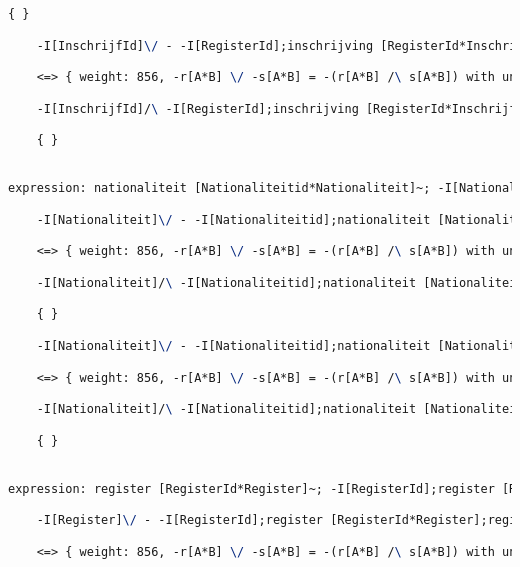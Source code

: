 \begin{lstlisting}[language=TeX]
    { }

    -I[InschrijfId]\/ - -I[RegisterId];inschrijving [RegisterId*InschrijfId];inschrijving [RegisterId*InschrijfId]~

    <=> { weight: 856, -r[A*B] \/ -s[A*B] = -(r[A*B] /\ s[A*B]) with unifier: {A->I[InschrijfId], B->I[InschrijfId], r->I[InschrijfId], s->inschrijving [RegisterId*InschrijfId]~;-I[RegisterId];inschrijving [RegisterId*InschrijfId]} }

    -I[InschrijfId]/\ -I[RegisterId];inschrijving [RegisterId*InschrijfId];inschrijving [RegisterId*InschrijfId]~

    { }


expression: nationaliteit [Nationaliteitid*Nationaliteit]~; -I[Nationaliteitid];nationaliteit [Nationaliteitid*Nationaliteit] |- -I[Nationaliteit]

    -I[Nationaliteit]\/ - -I[Nationaliteitid];nationaliteit [Nationaliteitid*Nationaliteit];nationaliteit [Nationaliteitid*Nationaliteit]~

    <=> { weight: 856, -r[A*B] \/ -s[A*B] = -(r[A*B] /\ s[A*B]) with unifier: {A->I[Nationaliteit], B->I[Nationaliteit], r->nationaliteit [Nationaliteitid*Nationaliteit]~;-I[Nationaliteitid];nationaliteit [Nationaliteitid*Nationaliteit], s->I[Nationaliteit]} }

    -I[Nationaliteit]/\ -I[Nationaliteitid];nationaliteit [Nationaliteitid*Nationaliteit];nationaliteit [Nationaliteitid*Nationaliteit]~

    { }

    -I[Nationaliteit]\/ - -I[Nationaliteitid];nationaliteit [Nationaliteitid*Nationaliteit];nationaliteit [Nationaliteitid*Nationaliteit]~

    <=> { weight: 856, -r[A*B] \/ -s[A*B] = -(r[A*B] /\ s[A*B]) with unifier: {A->I[Nationaliteit], B->I[Nationaliteit], r->I[Nationaliteit], s->nationaliteit [Nationaliteitid*Nationaliteit]~;-I[Nationaliteitid];nationaliteit [Nationaliteitid*Nationaliteit]} }

    -I[Nationaliteit]/\ -I[Nationaliteitid];nationaliteit [Nationaliteitid*Nationaliteit];nationaliteit [Nationaliteitid*Nationaliteit]~

    { }


expression: register [RegisterId*Register]~; -I[RegisterId];register [RegisterId*Register] |- -I[Register]

    -I[Register]\/ - -I[RegisterId];register [RegisterId*Register];register [RegisterId*Register]~

    <=> { weight: 856, -r[A*B] \/ -s[A*B] = -(r[A*B] /\ s[A*B]) with unifier: {A->I[Register], B->I[Register], r->register [RegisterId*Register]~;-I[RegisterId];register [RegisterId*Register], s->I[Register]} }


\end{lstlisting}
